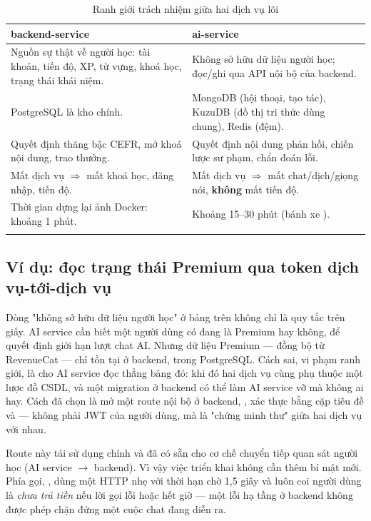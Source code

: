 \begin{longtable}{L{6.8cm} L{6.8cm}}
\toprule
\textbf{backend-service} & \textbf{ai-service}\\
\midrule
\endhead
Nguồn sự thật về người học: tài khoản, tiến độ, XP, từ vựng, khoá học, trạng thái khái niệm. &
Không sở hữu dữ liệu người học; đọc/ghi qua API nội bộ của backend.\\
PostgreSQL là kho chính. & MongoDB (hội thoại, tạo tác), KuzuDB (đồ thị tri thức dùng chung), Redis (đệm).\\
Quyết định thăng bậc CEFR, mở khoá nội dung, trao thưởng. & Quyết định nội dung phản hồi, chiến lược sư phạm, chẩn đoán lỗi.\\
Mất dịch vụ $\Rightarrow$ mất khoá học, đăng nhập, tiến độ. & Mất dịch vụ $\Rightarrow$ mất chat/dịch/giọng nói, \textbf{không} mất tiến độ.\\
Thời gian dựng lại ảnh Docker: khoảng 1 phút. & Khoảng 15--30 phút (bánh xe ).\\
\bottomrule
\caption{Ranh giới trách nhiệm giữa hai dịch vụ lõi}
\end{longtable}

\subsection{Ví dụ: đọc trạng thái Premium qua token dịch vụ-tới-dịch vụ}

Dòng "không sở hữu dữ liệu người học" ở bảng trên không chỉ là quy tắc trên giấy. AI
service cần biết một người dùng có đang là Premium hay không, để quyết định giới hạn
lượt chat AI. Nhưng dữ liệu Premium — đồng bộ từ RevenueCat — chỉ tồn tại ở backend,
trong PostgreSQL. Cách sai, vi phạm ranh giới, là cho AI service đọc thẳng bảng đó: khi
đó hai dịch vụ cùng phụ thuộc một lược đồ CSDL, và một migration ở backend có thể làm
AI service vỡ mà không ai hay. Cách đã chọn là mở một route nội bộ ở backend,
, xác thực bằng cặp tiêu đề
 và  — không phải JWT của
người dùng, mà là "chứng minh thư" giữa hai dịch vụ với nhau.

Route này tái sử dụng chính  và
 đã có sẵn cho cơ chế chuyển tiếp quan sát
người học (AI service $\rightarrow$ backend). Vì vậy việc triển khai không cần thêm bí
mật mới. Phía gọi, , dùng một
 HTTP nhẹ với thời hạn chờ 1,5 giây và luôn coi người dùng là
\textit{chưa trả tiền} nếu lời gọi lỗi hoặc hết giờ — một lỗi hạ tầng ở backend không
được phép chặn đứng một cuộc chat đang diễn ra.

